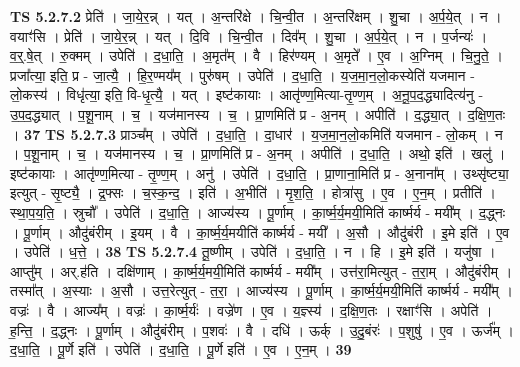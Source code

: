 \documentclass[17pt]{extarticle}
\begin{document}
                  \newline
                                \textbf{ TS 5.2.7.2} \newline
                  प्रेति॑ । जा॒ये॒र॒न्न् । यत् । अ॒न्तरि॑क्षे । चि॒न्वी॒त । अ॒न्तरि॑क्षम् । शु॒चा । अ॒र्प॒ये॒त् । न । वयाꣳ॑सि । प्रेति॑ । जा॒ये॒र॒न्न् । यत् । दि॒वि । चि॒न्वी॒त । दिव᳚म् । शु॒चा । अ॒र्प॒ये॒त् । न । प॒र्जन्यः॑ । व॒र्॒.षे॒त् । रु॒क्मम् । उपेति॑ । द॒धा॒ति॒ । अ॒मृत᳚म् । वै । हिर॑ण्यम् । अ॒मृते᳚ । ए॒व । अ॒ग्निम् । चि॒नु॒ते॒ । प्रजा᳚त्या॒ इति॒ प्र - जा॒त्यै॒ । हि॒र॒ण्मय᳚म् । पुरु॑षम् । उपेति॑ । द॒धा॒ति॒ । य॒ज॒मा॒न॒लो॒कस्येति॑ यजमान - लो॒कस्य॑ । विधृ॑त्या॒ इति॒ वि-धृ॒त्यै॒ । यत् । इष्ट॑कायाः । आतृ॑ण्ण॒मित्या-तृ॒ण्ण॒म् । अ॒नू॒प॒द॒द्ध्यादित्य॑नु - उ॒प॒द॒द्ध्यात् । प॒शू॒नाम् । च॒ । यज॑मानस्य । च॒ । प्रा॒णमिति॑ प्र - अ॒नम् । अपीति॑ । द॒द्ध्या॒त् । द॒क्षि॒ण॒तः । \textbf{  37} \newline
                  \newline
                                \textbf{ TS 5.2.7.3} \newline
                  प्राञ्च᳚म् । उपेति॑ । द॒धा॒ति॒ । दा॒धार॑ । य॒ज॒मा॒न॒लो॒कमिति॑ यजमान - लो॒कम् । न । प॒शू॒नाम् । च॒ । यज॑मानस्य । च॒ । प्रा॒णमिति॑ प्र - अ॒नम् । अपीति॑ । द॒धा॒ति॒ । अथो॒ इति॑ । खलु॑ । इष्ट॑कायाः । आतृ॑ण्ण॒मित्या - तृ॒ण्ण॒म् । अनु॑ । उपेति॑ । द॒धा॒ति॒ । प्रा॒णाना॒मिति॑ प्र - अ॒नाना᳚म् । उथ्सृ॑ष्ट्या॒ इत्युत् - सृ॒ष्ट्यै॒ । द्र॒फ्सः । च॒स्क॒न्द॒ । इति॑ । अ॒भीति॑ । मृ॒श॒ति॒ । होत्रा॑सु । ए॒व । ए॒न॒म् । प्रतीति॑ । स्था॒प॒य॒ति॒ । स्रुचौ᳚ । उपेति॑ । द॒धा॒ति॒ । आज्य॑स्य । पू॒र्णाम् । का॒र्ष्म॒र्य॒मयी॒मिति॑ कार्ष्मर्य - मयी᳚म् । द॒द्ध्नः । पू॒र्णाम् । औदु॑बंरीम् । इ॒यम् । वै । का॒र्ष्म॒र्य॒मयीति॑ कार्ष्मर्य - मयी᳚ । अ॒सौ । औदु॑बंरी । इ॒मे इति॑ । ए॒व । उपेति॑ । ध॒त्ते॒ । \textbf{  38} \newline
                  \newline
                                \textbf{ TS 5.2.7.4} \newline
                  तू॒ष्णीम् । उपेति॑ । द॒धा॒ति॒ । न । हि । इ॒मे इति॑ । यजु॑षा । आप्तु᳚म् । अर्.ह॑ति । दक्षि॑णाम् । का॒र्ष्म॒र्य॒मयी॒मिति॑ कार्ष्मर्य - मयी᳚म् । उत्त॑रा॒मित्युत् - त॒रा॒म् । औदु॑बंरीम् । तस्मा᳚त् । अ॒स्याः । अ॒सौ । उत्त॒रेत्युत् - त॒रा॒ । आज्य॑स्य । पू॒र्णाम् । का॒र्ष्म॒र्य॒मयी॒मिति॑ कार्ष्मर्य - मयी᳚म् । वज्रः॑ । वै । आज्य᳚म् । वज्रः॑ । का॒र्ष्म॒र्यः॑ । वज्रे॑ण । ए॒व । य॒ज्ञ्स्य॑ । द॒क्षि॒ण॒तः । रक्षाꣳ॑सि । अपेति॑ । ह॒न्ति॒ । द॒द्ध्नः । पू॒र्णाम् । औदु॑बंरीम् । प॒शवः॑ । वै । दधि॑ । ऊर्क् । उ॒दु॒बंरः॑ । प॒शुषु॑ । ए॒व । ऊर्ज᳚म् । द॒धा॒ति॒ । पू॒र्णे इति॑ । उपेति॑ । द॒धा॒ति॒ । पू॒र्णे इति॑ । ए॒व । ए॒न॒म् । \textbf{  39} \newline
\end{document}
